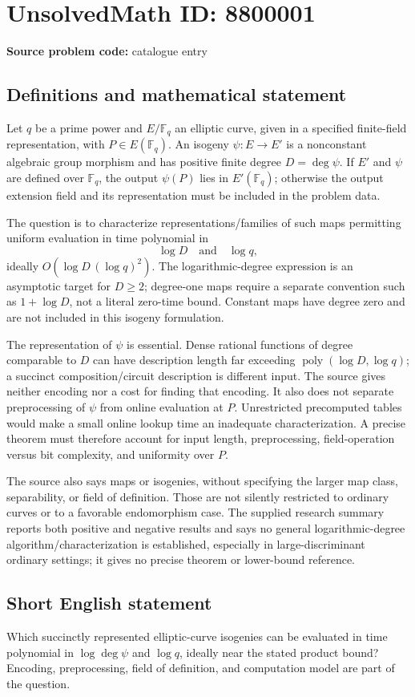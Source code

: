 \documentclass[11pt]{article}
\newcommand{\F}{\mathbb{F}}
\begin{document}
\section*{UnsolvedMath ID: 8800001}
\textbf{Source problem code:} catalogue entry
\subsection{Definitions and mathematical statement}
Let \(q\) be a prime power and \(E/\F_q\) an elliptic curve, given in a specified finite-field representation, with \(P\in E(\F_q)\). An isogeny \(\psi:E\to E'\) is a nonconstant algebraic group morphism and has positive finite degree \(D=\deg\psi\). If \(E'\) and \(\psi\) are defined over \(\F_q\), the output \(\psi(P)\) lies in \(E'(\F_q)\); otherwise the output extension field and its representation must be included in the problem data.

The question is to characterize representations/families of such maps permitting uniform evaluation in time polynomial in
\[
\log D\quad\text{and}\quad\log q,
\]
ideally \(O(\log D\,(\log q)^2)\). The logarithmic-degree expression is an asymptotic target for \(D\ge2\); degree-one maps require a separate convention such as \(1+\log D\), not a literal zero-time bound. Constant maps have degree zero and are not included in this isogeny formulation.

The representation of \(\psi\) is essential. Dense rational functions of degree comparable to \(D\) can have description length far exceeding \(\operatorname{poly}(\log D,\log q)\); a succinct composition/circuit description is different input. The source gives neither encoding nor a cost for finding that encoding. It also does not separate preprocessing of \(\psi\) from online evaluation at \(P\). Unrestricted precomputed tables would make a small online lookup time an inadequate characterization. A precise theorem must therefore account for input length, preprocessing, field-operation versus bit complexity, and uniformity over \(P\).

The source also says maps or isogenies, without specifying the larger map class, separability, or field of definition. Those are not silently restricted to ordinary curves or to a favorable endomorphism case. The supplied research summary reports both positive and negative results and says no general logarithmic-degree algorithm/characterization is established, especially in large-discriminant ordinary settings; it gives no precise theorem or lower-bound reference.
\subsection{Short English statement}
Which succinctly represented elliptic-curve isogenies can be evaluated in time polynomial in \(\log\deg\psi\) and \(\log q\), ideally near the stated product bound? Encoding, preprocessing, field of definition, and computation model are part of the question.
\end{document}
